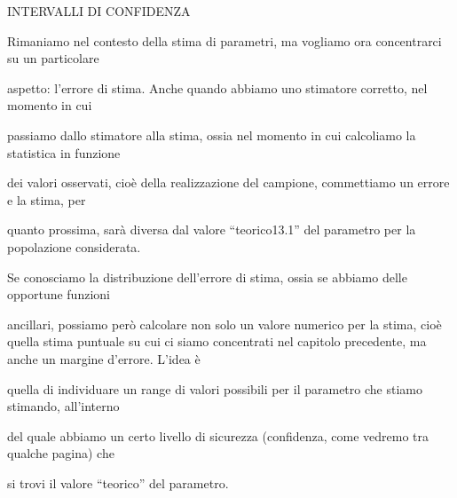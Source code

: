\documentclass[a4paper,portrait,12pt]{article}
\begin{document}
\begin{flushleft}
INTERVALLI DI CONFIDENZA
\end{flushleft}


\begin{flushleft}
Rimaniamo nel contesto della stima di parametri, ma vogliamo ora concentrarci su un particolare
\end{flushleft}


\begin{flushleft}
aspetto: l'errore di stima. Anche quando abbiamo uno stimatore corretto, nel momento in cui
\end{flushleft}


\begin{flushleft}
passiamo dallo stimatore alla stima, ossia nel momento in cui calcoliamo la statistica in funzione
\end{flushleft}


\begin{flushleft}
dei valori osservati, cio\`{e} della realizzazione del campione, commettiamo un errore e la stima, per
\end{flushleft}


\begin{flushleft}
quanto prossima, sar\`{a} diversa dal valore {``}teorico13.1'' del parametro per la popolazione considerata.
\end{flushleft}


\begin{flushleft}
Se conosciamo la distribuzione dell'errore di stima, ossia se abbiamo delle opportune funzioni
\end{flushleft}


\begin{flushleft}
ancillari, possiamo per\`{o} calcolare non solo un valore numerico per la stima, cio\`{e} quella stima puntuale su cui ci siamo concentrati nel capitolo precedente, ma anche un margine d'errore. L'idea \`{e}
\end{flushleft}


\begin{flushleft}
quella di individuare un range di valori possibili per il parametro che stiamo stimando, all'interno
\end{flushleft}


\begin{flushleft}
del quale abbiamo un certo livello di sicurezza (confidenza, come vedremo tra qualche pagina) che
\end{flushleft}


\begin{flushleft}
si trovi il valore {``}teorico'' del parametro.
\end{flushleft}
\end{document}
